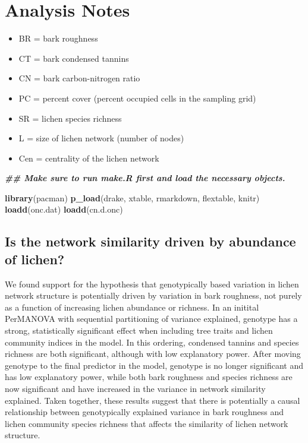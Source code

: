 \documentclass[
]{article}
\author{}
\date{\vspace{-2.5em}}
\newenvironment{Shaded}{\begin{snugshade}}{\end{snugshade}}
\newcommand{\DocumentationTok}[1]{\textcolor[rgb]{0.56,0.35,0.01}{\textbf{\textit{#1}}}}
\newcommand{\FunctionTok}[1]{\textcolor[rgb]{0.13,0.29,0.53}{\textbf{#1}}}
\newcommand{\NormalTok}[1]{#1}
\providecommand{\tightlist}{%
  \setlength{\itemsep}{0pt}\setlength{\parskip}{0pt}}
\begin{document}
\section{Analysis Notes}\label{analysis-notes}

\begin{itemize}
\tightlist
\item
  BR = bark roughness
\item
  CT = bark condensed tannins
\item
  CN = bark carbon-nitrogen ratio
\item
  PC = percent cover (percent occupied cells in the sampling grid)
\item
  SR = lichen species richness
\item
  L = size of lichen network (number of nodes)
\item
  Cen = centrality of the lichen network
\end{itemize}

\begin{Shaded}
\begin{Highlighting}[]
\DocumentationTok{\#\# Make sure to run make.R first and load the necessary objects.}

\FunctionTok{library}\NormalTok{(pacman)}
\FunctionTok{p\_load}\NormalTok{(drake, xtable, rmarkdown, flextable, knitr)}
\FunctionTok{loadd}\NormalTok{(onc.dat)}
\FunctionTok{loadd}\NormalTok{(cn.d.onc)}
\end{Highlighting}
\end{Shaded}

\subsection{Is the network similarity driven by abundance of
lichen?}\label{is-the-network-similarity-driven-by-abundance-of-lichen}

We found support for the hypothesis that genotypically based variation
in lichen network structure is potentially driven by variation in bark
roughness, not purely as a function of increasing lichen abundance or
richness. In an initital PerMANOVA with sequential partitioning of
variance explained, genotype has a strong, statistically significant
effect when including tree traits and lichen community indices in the
model. In this ordering, condensed tannins and species richness are both
significant, although with low explanatory power. After moving genotype
to the final predictor in the model, genotype is no longer significant
and has low explanatory power, while both bark roughness and species
richness are now significant and have increased in the variance in
network similarity explained. Taken together, these results suggest that
there is potentially a causal relationship between genotypically
explained variance in bark roughness and lichen community species
richness that affects the similarity of lichen network structure.
\end{document}
